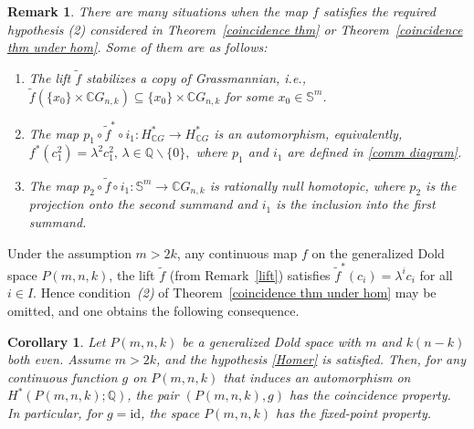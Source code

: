 \documentclass{amsart}
\newtheorem{remark}[theorem]{Remark}
\newtheorem{corollary}[theorem]{Corollary}
\newcommand{\thmref}[1]{Theorem~\ref{#1}}
\begin{document}
\begin{remark}
	There are many situations when the map $f$ satisfies the required hypothesis \textit{(2)} considered in \thmref{coincidence thm} or \thmref{coincidence thm under hom}. Some of them are as follows: 
	\begin{enumerate}
		\item The lift $\tilde f$ stabilizes a copy of Grassmannian, i.e., $\tilde f(\{x_0\}\times\mathbb CG_{n,k})\subseteq \{x_0\}\times\mathbb CG_{n,k}$ for some $x_0\in \mathbb S^m$. 
		\item  The map $p_1\circ \tilde f^*\circ i_1: H^*_{\mathbb CG}\to H^*_{\mathbb C G}$ is an automorphism, equivalently, $f^*(c_1^2)=\lambda^2c_1^2,\, \lambda\in \mathbb Q\backslash \{0\},$ where $p_1$ and $i_1$ are defined in \eqref{comm diagram}.
		\item The map $p_2\circ \tilde f\circ i_1:\mathbb S^m\to \mathbb CG_{n,k}$ is rationally null homotopic, where $p_2$ is the projection onto the second summand and $i_1$ is the inclusion into the first summand. %
	\end{enumerate} 
\end{remark}



	Under the assumption $m>2k$, any continuous map $f$ on the generalized Dold space $P(m,n,k)$, the lift $\tilde f$ (from Remark~\ref{lift}) satisfies $\tilde f^{*}(c_i)=\lambda^ic_i$ for all $i\in I$. Hence condition~\textit{(2)} of Theorem~\ref{coincidence thm under hom} may be omitted, and one obtains the following consequence.
	\begin{corollary}
		Let $P(m,n,k)$ be a generalized Dold space with $m$ and $k(n-k)$ both even. Assume $m>2k$, and the hypothesis \eqref{Homer} is satisfied.
		Then, for any continuous function $g$ on $P(m,n,k)$ that induces an automorphism on $H^*(P(m,n,k);\mathbb{Q})$, the pair $(P(m,n,k),g)$ has the coincidence property. \\ In particular, for $g=\mathrm{id}$, the space $P(m,n,k)$ has the fixed-point property.
	\end{corollary}
\end{document}
